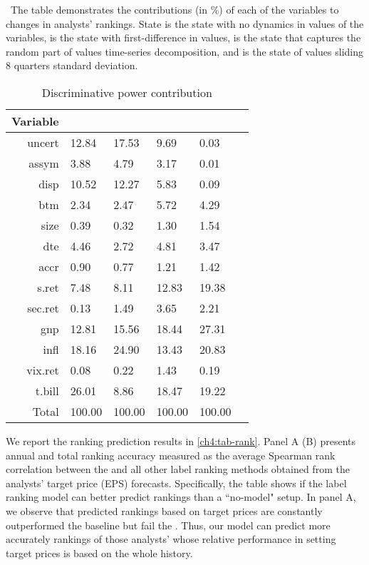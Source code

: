\documentclass[12pt,a4paper]{article}\usepackage[]{graphicx}\usepackage[]{color}
\begin{document}
\begin{table}
\caption{Discriminative power contribution}
\ The table demonstrates the contributions (in \%) of each of the variables to changes in analysts' rankings. State \last{} is the state with no dynamics in values of the variables, \diff{} is the state with first-difference in values, \random{} is the state that captures the random part of values time-series decomposition,  and \rollsd{} is the state of values sliding 8 quarters standard deviation.

\begin{tabu} to 
\toprule
Variable&\last{}&\diff{}&\random{}&\rollsd{} \\
\midrule

 uncert & 12.84 & 17.53 & 9.69 & 0.03 \\ 
  assym & 3.88 & 4.79 & 3.17 & 0.01 \\ 
  disp & 10.52 & 12.27 & 5.83 & 0.09 \\ 
  btm & 2.34 & 2.47 & 5.72 & 4.29 \\ 
  size & 0.39 & 0.32 & 1.30 & 1.54 \\ 
  dte & 4.46 & 2.72 & 4.81 & 3.47 \\ 
  accr & 0.90 & 0.77 & 1.21 & 1.42 \\ 
  s.ret & 7.48 & 8.11 & 12.83 & 19.38 \\ 
  sec.ret & 0.13 & 1.49 & 3.65 & 2.21 \\ 
  gnp & 12.81 & 15.56 & 18.44 & 27.31 \\ 
  infl & 18.16 & 24.90 & 13.43 & 20.83 \\ 
  vix.ret & 0.08 & 0.22 & 1.43 & 0.19 \\ 
  t.bill & 26.01 & 8.86 & 18.47 & 19.22 \\ 
   \midrule 
Total & 100.00 & 100.00 & 100.00 & 100.00 \\ 
  

\bottomrule
\end{tabu}
\label{ch4:tab-dp}
\end{table}



We report the ranking prediction results in \ref{ch4:tab-rank}. Panel A (B)  presents annual and total ranking accuracy measured as the average Spearman rank correlation between the \true{} and all other label ranking methods obtained from the analysts' target price (EPS) forecasts. Specifically, the table shows  if the label ranking model can better predict rankings than a ``no-model" setup.  In panel A, we observe that  predicted rankings based on target prices are constantly outperformed the  baseline but fail  the  \naive{}. Thus, our model can predict more accurately rankings of those analysts' whose  relative performance in setting target prices is based on the whole history. 
\end{document}
